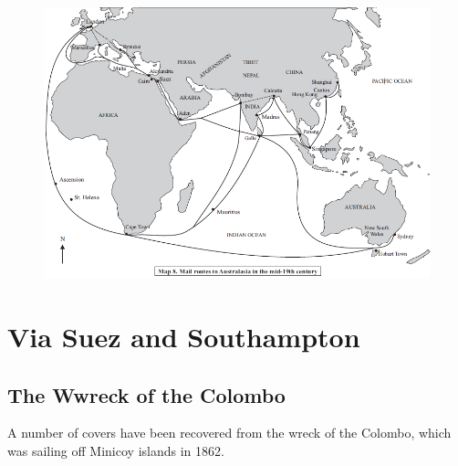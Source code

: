 \documentclass[justified]{tufte-book}
\begin{document}
\begin{landscape}
\begin{figure}
\includegraphics[height=0.95\textheight]{./graphics/NZ/australasian-routes}
\end{figure}
\end{landscape}









\chapter{Via Suez and Southampton}










\section{The Wwreck of the Colombo}
\flushleft
A number of covers have been recovered from the wreck of the Colombo, which was sailing off Minicoy islands in 1862.
\end{document}
